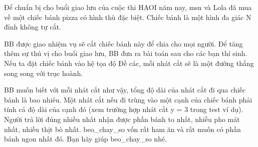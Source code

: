 Để chuẩn bị cho buổi giao lưu của cuộc thi HAOI năm nay, msn và Lola đã mua về một chiếc bánh pizza có hình thù đặc biệt. Chiếc bánh là một hình đa giác N đỉnh không tự cắt.  

   BB được giao nhiệm vụ sẽ cắt chiếc bánh này để chia cho mọi người. Để tăng thêm sự thú vị cho buổi giao lưu, BB đưa ra bài toán sau cho các bạn thí sinh. Nếu ta đặt chiếc bánh vào hệ tọa độ Đề các, mỗi nhát cắt sẽ là một đường thẳng song song với trục hoành.  

   BB muốn biết với mỗi nhát cắt như vậy, tổng độ dài của nhát cắt đi qua chiếc bánh là bao nhiêu. Một nhát cắt nếu đi trùng vào một cạnh của chiếc bánh phải tính cả độ dài của cạnh đó (xem trường hợp nhát cắt y = 3 trong test ví dụ). Người trả lời đúng nhiều nhất nhận được phần bánh to nhất, nhiều pho mát nhất, nhiều thịt bò nhất. beo\_chay\_so vốn rất ham ăn và rất muốn có phần bánh ngon nhất đó. Bạn hãy giúp beo\_chay\_so nhé.  

\